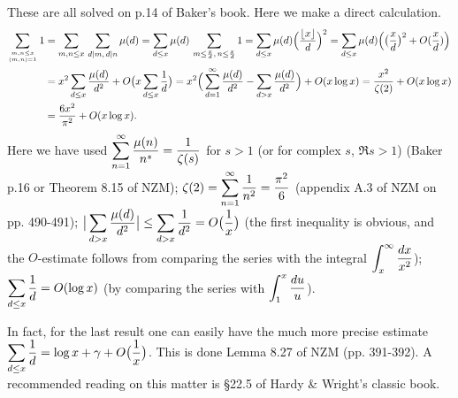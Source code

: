 \documentclass[12pt]{article}
\begin{document}
These are all solved on p.14 of Baker's book. Here we make a direct calculation.
\begin{align*}
\sum_{m,n \leq x \atop (m,n)=1}1 & = \sum_{m,n \leq x}\,\sum_{d\mid m,\, d\mid n}\mu(d) 
= \sum_{d\leq x}\mu(d) \, \sum_{m \leq {x\over d},\, n\leq {x\over d}} 1
= \sum_{d\leq x}\mu(d)\Big({\lfloor x\rfloor\over d}\Big)^2 = \sum_{d\leq x}\mu(d)\Big(\big({x\over d}\big)^2 + O({x\over d})\Big) \\
& = x^2 \sum_{d\leq x}{\mu(d)\over d^2} + O\big(x\sum_{d\leq x}{1\over d}\big) = x^2 \Big( \sum_{d=1}^{\infty}{\mu(d)\over d^2} -
\sum_{d > x}{\mu(d)\over d^2} \Big) +O(x\log x) = {x^2\over \zeta(2)} + O(x\log x) \\
& = {6x^2\over \pi^2} + O(x\log x).
\end{align*}
Here we have used $\displaystyle \sum_{n=1}^{\infty}{\mu(n)\over n^s} = {1\over \zeta(s)}$ for $s>1$ (or for complex $s$, $\Re s > 1$) (Baker  p.16 or
Theorem 8.15 of NZM);
$\displaystyle \zeta(2) =\sum_{n=1}^{\infty}{1\over n^2} ={\pi^2\over 6}$ (appendix A.3 of NZM on pp. 490-491); $\displaystyle \big|\sum_{d > x}{\mu(d)\over d^2}\big| \leq  
\sum_{d > x}{1\over d^2} =O\big({1\over x}\big)$ (the first inequality is obvious, and the $O$-estimate follows from comparing the series 
with the integral $\displaystyle \int_{x}^{\infty}{dx\over x^2}$); $\displaystyle \sum_{d\leq x}{1\over d} = O(\log x)$ (by comparing the series with $\displaystyle
\int_{1}^{x}{du\over u}$).

In fact, for the last result one can easily have the much more precise estimate 
$\displaystyle \sum_{d\leq x}{1\over d} = \log x + \gamma +O\big({1\over x}\big)$. This is done Lemma 8.27 of NZM (pp. 391-392). A recommended reading
on this matter is \S 22.5 of Hardy \& Wright's classic book.
\end{document}
